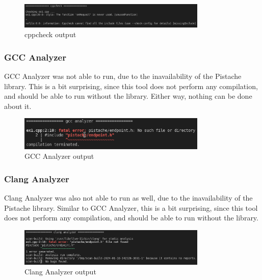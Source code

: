 \documentclass{article}
\begin{document}
\begin{figure}[ht!]
    \centering
    \includegraphics[width=0.8\textwidth]{images/ex1/cppcheck.png}
    \caption{cppcheck output}\label{fig:ex1/cppcheck}
\end{figure}

\subsubsection{GCC Analyzer}

GCC Analyzer was not able to run, due to the inavailability of the Pistache library. This is a bit surprising, since this tool does not perform any compilation, and should be able to run without the library. Either way, nothing can be done about it.

\begin{figure}[ht!]
    \centering
    \includegraphics[width=0.8\textwidth]{images/ex1/gccAnalyzer.png}
    \caption{GCC Analyzer output}
    \label{fig:ex1/gccAnalyzer}
\end{figure}

\subsubsection{Clang Analyzer}

Clang Analyzer was also not able to run as well, due to the inavailability of the Pistache library. Similar to GCC Analyzer, this is a bit surprising, since this tool does not perform any compilation, and should be able to run without the library.

\begin{figure}[ht!]
    \centering
    \includegraphics[width=0.8\textwidth]{images/ex1/clangAnalyzer.png}
    \caption{Clang Analyzer output}\label{fig:ex1/clangAnalyzer}
\end{figure}
\end{document}
